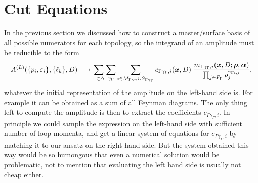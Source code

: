 \section{Cut Equations}
\label{sec:cut_equations}
{

In the previous section we discussed how to construct a master/surface basis
of all possible numerators for each topology, so the integrand of an amplitude must 
be reducible to the form
\begin{equation} \label{eq:unitarity_ansatz}
  A^{(L)}(\{p_i,\varepsilon_i\}, \{\ell_k\}, D) \longrightarrow  
  \sum_{\Gamma \in \Delta} \sum_{\gamma_\Gamma} \sum_{i \in M_{\Gamma\gamma_\Gamma} \cup S_{\Gamma\gamma_\Gamma}} c_{\Gamma\gamma_\Gamma, i}(\vb*{x},D) \;
  \frac{m_{\Gamma\gamma_\Gamma, i} (\vb*{x},D;\vb*{\rho},\vb*{\alpha}) }%
    {\prod_{j\in P_\Gamma} \rho_j^{\gamma_{\Gamma i, j}}},
\end{equation}
whatever the initial representation of the amplitude on the left-hand side is.
For example it can be obtained as a sum of all Feynman diagrams.
The only thing left to compute the amplitude is then
to extract the coefficients $c_{\Gamma\gamma_\Gamma, i}$.
In principle we could sample the expression on the left-hand side with sufficient number of loop momenta,
and get a linear system of equations for $c_{\Gamma\gamma_\Gamma, i}$ by matching it to our ansatz on the right hand side.
But the system obtained this way would be so humongous that even a numerical solution would be problematic,
not to mention that evaluating the left hand side is usually not cheap either.

}
